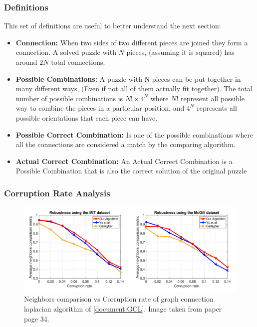 \documentclass{article}
\begin{document}
\subsubsection{Definitions}\label{document:proof_definitions}
This set of definitions are useful to better understand the next section:

\begin{itemize}
  \item \textbf{Connection:}\newline
  When two sides of two different pieces are joined they form a connection.
  A solved puzzle with \(N\) pieces, (assuming it is squared) has around \(2N\) total connections.

  \item \textbf{Possible Combinations:}\newline
  A puzzle with N pieces can be put together in many different ways,
  (Even if not all of 	them actually fit together).
  The total number of possible combinations is \(N! \times 4^N\) where
  \(N!\) represent all possible way to combine the pieces in a particular position, and
  \(4^N\) represents all possible orientations that each piece can have.
  \item \textbf{Possible Correct Combination:}\newline
  Is one of the possible combinations where all the connections are considered a match
  by the comparing algorithm.
  \item \textbf{Actual Correct Combination:}\newline
  An Actual Correct Combination is a Possible Combination that
  is also the correct solution of the original puzzle	
\end{itemize}

\subsubsection{Corruption Rate Analysis}
\begin{figure}[H]
  \caption{Neighbors comparison vs Corruption rate of graph connection laplacian algorithm of \cref{document:GCL}. Image taken from paper~\cite{GCL} page 34.}\label{fig:GCL_Corruption_Rate}
  \centering
  \includegraphics[height=0.35\textwidth]{pictures/corruption_rate.png}
\end{figure}
\end{document}
